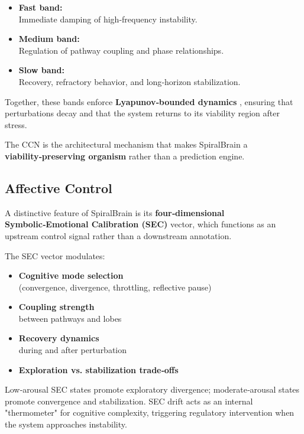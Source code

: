 \documentclass[12pt,a4paper]{report}
\begin{document}
\begin{itemize}
\item \textbf{Fast band:} \\
  Immediate damping of high‑frequency instability.

\item \textbf{Medium band:} \\
  Regulation of pathway coupling and phase relationships.

\item \textbf{Slow band:} \\
  Recovery, refractory behavior, and long‑horizon stabilization.
\end{itemize}

Together, these bands enforce \textbf{Lyapunov‑bounded dynamics} \cite{Lyapunov1992}, ensuring that perturbations decay and that the system returns to its viability region after stress.

The CCN is the architectural mechanism that makes SpiralBrain \cite{SpiralBrainV3} a \textbf{viability‑preserving organism} rather than a prediction engine.

\subsection{Affective Control}

A distinctive feature of SpiralBrain \cite{SpiralBrainV3} is its \textbf{four‑dimensional Symbolic‑Emotional Calibration (SEC)} vector, which functions as an upstream control signal rather than a downstream annotation.

The SEC vector modulates:

\begin{itemize}
\item \textbf{Cognitive mode selection} \\
  (convergence, divergence, throttling, reflective pause)

\item \textbf{Coupling strength} \\
  between pathways and lobes

\item \textbf{Recovery dynamics} \\
  during and after perturbation

\item \textbf{Exploration vs. stabilization trade‑offs}
\end{itemize}

Low‑arousal SEC states promote exploratory divergence; moderate‑arousal states promote convergence and stabilization. SEC drift acts as an internal "thermometer" for cognitive complexity, triggering regulatory intervention when the system approaches instability.
\end{document}
